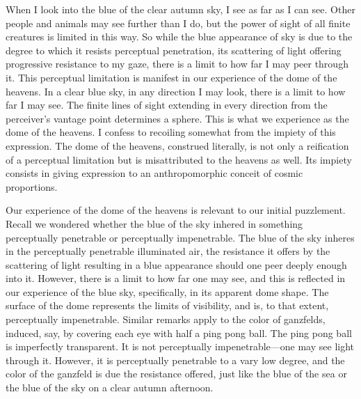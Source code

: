 When I look into the blue of the clear autumn sky, I see as far as I can see. Other people and animals may see further than I do, but the power of sight of all finite creatures is limited in this way. So while the blue appearance of sky is due to the degree to which it resists perceptual penetration, its scattering of light offering progressive resistance to my gaze, there is a limit to how far I may peer through it. This perceptual limitation is manifest in our experience of the dome of the heavens. In a clear blue sky, in any direction I may look, there is a limit to how far I may see. The finite lines of sight extending in every direction from the perceiver's vantage point determines a sphere. This is what we experience as the dome of the heavens. I confess to recoiling somewhat from the impiety of this expression. The dome of the heavens, construed literally, is not only a reification of a perceptual limitation but is misattributed to the heavens as well. Its impiety consists in giving expression to an anthropomorphic conceit of cosmic proportions.

Our experience of the dome of the heavens is relevant to our initial puzzlement. Recall we wondered whether the blue of the sky inhered in something perceptually penetrable or perceptually impenetrable. The blue of the sky inheres in the perceptually penetrable illuminated air, the resistance it offers by the scattering of light resulting in a blue appearance should one peer deeply enough into it. However, there is a limit to how far one may see, and this is reflected in our experience of the blue sky, specifically, in its apparent dome shape. The surface of the dome represents the limits of visibility, and is, to that extent, perceptually impenetrable. Similar remarks apply to the color of ganzfelds, induced, say, by covering each eye with half a ping pong ball. The ping pong ball is imperfectly transparent. It is not perceptually impenetrable---one may see light through it. However, it is perceptually penetrable to a vary low degree, and the color of the ganzfeld is due the resistance offered, just like the blue of the sea or the blue of the sky on a clear autumn afternoon.

